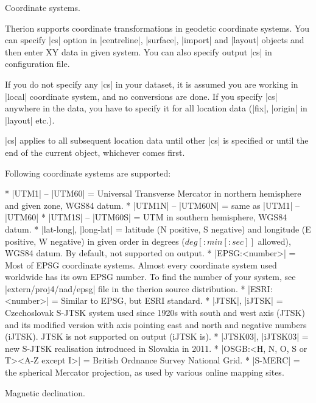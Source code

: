 \subchapter Coordinate systems.

Therion supports coordinate transformations in geodetic coordinate systems.
You can specify |cs| option in |centreline|, |surface|, |import| and
|layout| objects and then enter XY data in given system.
You can also specify output |cs| in configuration file.

If you do not specify any |cs| in your dataset,
it is assumed you are working in |local| coordinate system, and no
conversions are done. If you specify |cs| anywhere in the data, you have to
specify it for all location data (|fix|, |origin| in |layout| etc.).

|cs| applies to all subsequent location data until other |cs| is specified or
until the end of the current object, whichever comes first.

Following coordinate systems are supported:

\list
* |UTM1| -- |UTM60| = Universal Transverse Mercator in northern hemisphere
  and given zone, WGS84 datum.
* |UTM1N| -- |UTM60N| = same as |UTM1| -- |UTM60|
* |UTM1S| -- |UTM60S| = UTM in southern hemisphere, WGS84 datum.
* |lat-long|, |long-lat| = latitude (N positive, S negative) and
  longitude (E positive, W negative) in given order in degrees
  ($deg[{:}min[{:}sec]]$ allowed), WGS84 datum. By default, not
  supported on output.
* |EPSG:<number>| = Most of EPSG coordinate systems. Almost every
  coordinate system used worldwide has its own EPSG number. To find
  the number of your system, see |extern/proj4/nad/epsg| file in the
  therion source distribution.
* |ESRI:<number>| = Similar to EPSG, but ESRI standard.
* |JTSK|, |iJTSK| = Czechoslovak S-JTSK system used since 1920s with south and west
  axis (JTSK) and its modified version with axis
  pointing east and north and negative numbers (iJTSK). JTSK is
  not supported on output (iJTSK is).
* |JTSK03|, |iJTSK03| = new S-JTSK realisation introduced in Slovakia in 2011.
* |OSGB:<H, N, O, S or T><A-Z except I>| = British Ordnance Survey National
  Grid.
* |S-MERC| = the spherical Mercator projection, as used by various online mapping sites.
\endlist

\subchapter Magnetic declination.

